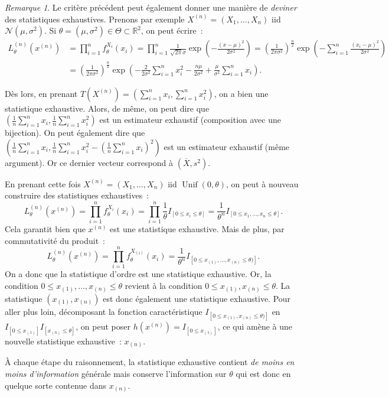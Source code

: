 \documentclass{report}
\DeclareMathOperator{\Unif}{Unif}  %
\newcommand{\Nms}{\mathcal N(\mu, \sigma^2)}
\newcommand{\R}{\mathbb R}
\newcommand{\charfun}[1]{I_{\left[#1\right]}}
\theoremstyle{definition}
\theoremstyle{remark}
\newtheorem*{rmq}{Remarque}
\begin{document}
		\begin{rmq} Le critère précédent peut également donner une manière de \textit{deviner} des statistiques exhaustives. Prenons par exemple
		$X^{(n)} = (X_1, \ldots, X_n)$ iid $\Nms$. Si $\theta = (\mu, \sigma^2) \in \Theta \subset \R^2$, on peut écrire~:
		\begin{align*}
			L_\theta^{(n)}(x^{(n)}) &= \prod_{i=1}^nf^{X_i}_\theta(x_i) = \prod_{i=1}^n\frac 1{\sqrt {2\pi}\sigma}\exp\left(-\frac {(x-\mu)^2}{2\sigma^2}\right)
				= \left(\frac 1{2\pi\sigma^2}\right)^{\frac n2}\exp\left(-\sum_{i=1}^n\frac {(x_i-\mu)^2}{2\sigma^2}\right) \\
			&= \left(\frac 1{2\pi\sigma^2}\right)^{\frac n2}\exp\left(-\frac 2{2\sigma^2}\sum_{i=1}^nx_i^2 - \frac {n\mu}{2\sigma^2} + \frac \mu{\sigma^2}\sum_{i=1}^nx_i\right).
		\end{align*}

		Dès lors, en prenant $T(X^{(n)}) = \left(\sum_{i=1}^nx_i, \sum_{i=1}^nx_i^2\right)$, on a bien une statistique exhaustive. Alors, de même, on peut dire que
		$\left(\frac 1n\sum_{i=1}^nx_i, \frac 1n\sum_{i=1}^nx_i^2\right)$ est un estimateur exhaustif (composition avec une bijection). On peut également dire que
		$\left(\frac 1n\sum_{i=1}^nx_i, \frac 1n\sum_{i=1}^nx_i^2 - \left(\frac 1n\sum_{i=1}^nx_i\right)^2\right)$ est un estimateur exhaustif (même argument). Or
		ce dernier vecteur correspond à $(\overline X, s^2)$.

		En prenant cette fois $X^{(n)} = (X_1, \ldots, X_n)$ iid $\Unif(0, \theta)$, on peut à nouveau construire des statistiques exhaustives~:
		\[L_\theta^{(n)}(x^{(n)}) = \prod_{i=1}^nf^{X_i}_\theta(x_i) = \prod_{i=1}^n\frac 1\theta\charfun{0 \leq x_i \leq \theta}
			= \frac 1{\theta^n}\charfun{0 \leq x_1, \ldots, x_n \leq \theta}.\]
		Cela garantit bien que $x^{(n)}$ est une statistique exhaustive. Mais de plus, par commutativité du produit~:
		\[L_\theta^{(n)}(x^{(n)}) = \prod_{i=1}^nf^{X_{(i)}}_\theta(x_i) = \frac 1{\theta^n}\charfun{0 \leq x_{(1)}, \ldots, x_{(n)} \leq \theta)}.\]
		On a donc que la statistique d'ordre est une statistique exhaustive. Or, la condition $0 \leq x_{(1)}, \ldots, x_{(n)} \leq \theta$ revient à la condition
		$0 \leq x_{(1)}, x_{(n)} \leq \theta$. La statistique $(x_{(1)}, x_{(n)})$ est donc également une statistique exhaustive. Pour aller plus loin, décomposant
		la fonction caractéristique $\charfun {0 \leq x_{(1)}, x_{(n)} \leq \theta)}$ en $\charfun {0 \leq x_{(1)}}\charfun{x_{(n)} \leq \theta}$, on peut poser
		$h(x^{(n)}) = \charfun{0 \leq x_{(1)}}$, ce qui amène à une nouvelle statistique exhaustive~: $x_{(n)}$.

		À chaque étape du raisonnement, la statistique exhaustive contient \textit{de moins en moins d'information} générale mais conserve l'information sur $\theta$
		qui est donc en quelque sorte contenue dans $x_{(n)}$.
		\end{rmq}
\end{document}

